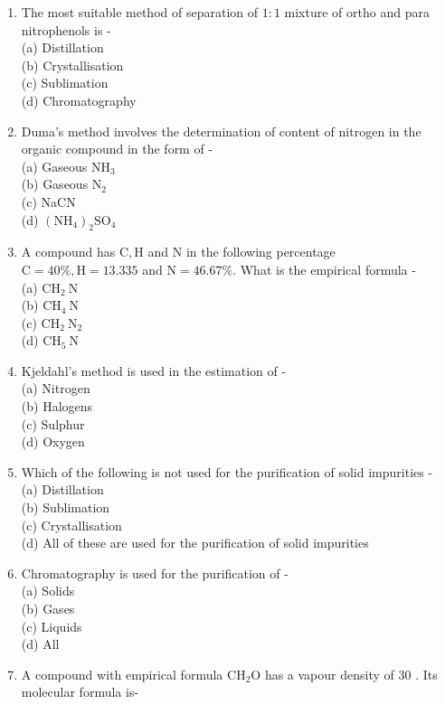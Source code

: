 \documentclass[10pt]{article}
\begin{document}
\begin{enumerate}
  \item The most suitable method of separation of $1: 1$ mixture of ortho and para nitrophenols is -\\
(a) Distillation\\
(b) Crystallisation\\
(c) Sublimation\\
(d) Chromatography
  \item Duma's method involves the determination of content of nitrogen in the organic compound in the form of -\\
(a) Gaseous $\mathrm{NH}_{3}$\\
(b) Gaseous $\mathrm{N}_{2}$\\
(c) NaCN\\
(d) $\left(\mathrm{NH}_{4}\right)_{2} \mathrm{SO}_{4}$
  \item A compound has $\mathrm{C}, \mathrm{H}$ and N in the following percentage $\mathrm{C}=40 \%, \mathrm{H}=13.335$ and $\mathrm{N}=46.67 \%$. What is the empirical formula -\\
(a) $\mathrm{CH}_{2} \mathrm{~N}$\\
(b) $\mathrm{CH}_{4} \mathrm{~N}$\\
(c) $\mathrm{CH}_{2} \mathrm{~N}_{2}$\\
(d) $\mathrm{CH}_{5} \mathrm{~N}$
  \item Kjeldahl's method is used in the estimation of -\\
(a) Nitrogen\\
(b) Halogens\\
(c) Sulphur\\
(d) Oxygen
  \item Which of the following is not used for the purification of solid impurities -\\
(a) Distillation\\
(b) Sublimation\\
(c) Crystallisation\\
(d) All of these are used for the purification of solid impurities
  \item Chromatography is used for the purification of -\\
(a) Solids\\
(b) Gases\\
(c) Liquids\\
(d) All
  \item A compound with empirical formula $\mathrm{CH}_{2} \mathrm{O}$ has a vapour density of 30 . Its molecular formula is-\\

\end{enumerate}
\end{document}

